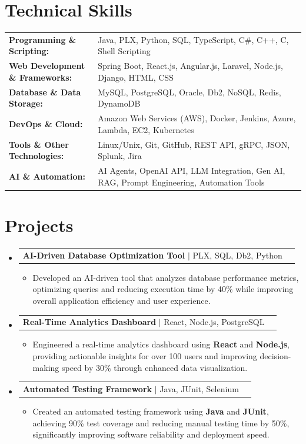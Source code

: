 \documentclass[letterpaper,10pt]{article}
\makeatletter
\newcommand{\resumeItem}[1]{
  \item{\fontsize{8pt}{9pt}\selectfont
    #1 \vspace{-3pt}
  }
}
\newcommand{\resumeProjectHeading}[2]{
    \item
    \begin{tabular*}{1.001\textwidth}{l@{\extracolsep{\fill}}r}
      \fontsize{8.5pt}{10pt}#1 & \textbf{\fontsize{8.5pt}{10pt} #2}\\
    \end{tabular*}\vspace{-7pt}
}
\newcommand{\resumeSubHeadingListStart}{\begin{itemize}[leftmargin=0pt, label={}]}
\newcommand{\resumeSubHeadingListEnd}{\end{itemize}}
\newcommand{\resumeItemListStart}{\begin{itemize}[leftmargin=*]}
\newcommand{\resumeItemListEnd}{\end{itemize}\vspace{-5pt}}
\makeatother
\begin{document}
\section{Technical Skills}
        \vspace{-14pt}
        \begin{table}[h]
            \fontsize{8pt}{9pt}\selectfont
            \begin{tabular}{p{0.3\linewidth} p{0.7\linewidth}}
                \textbf{Programming \& Scripting:} & Java, PLX, Python, SQL, TypeScript, C\#, C++, C, Shell Scripting \\
                \textbf{Web Development \& Frameworks:} & Spring Boot, React.js, Angular.js, Laravel, Node.js, Django, HTML, CSS \\
                \textbf{Database \& Data Storage:} & MySQL, PostgreSQL, Oracle, Db2, NoSQL, Redis, DynamoDB \\
                \textbf{DevOps \& Cloud:} & Amazon Web Services (AWS), Docker, Jenkins, Azure, Lambda, EC2, Kubernetes \\
                \textbf{Tools \& Other Technologies:} & Linux/Unix, Git, GitHub, REST API, gRPC, JSON, Splunk, Jira \\
                \textbf{AI \& Automation:} & AI Agents, OpenAI API, LLM Integration, Gen AI, RAG, Prompt Engineering, Automation Tools \\
            \end{tabular}
        \end{table}
 \vspace{-18pt}

\section{Projects}
    \vspace{-5pt}
    \resumeSubHeadingListStart
          \resumeProjectHeading
            {\textbf{AI-Driven Database Optimization Tool} $|$ PLX, SQL, Db2, Python}{}
            \resumeItemListStart
                \resumeItem{Developed an AI-driven tool that analyzes database performance metrics, optimizing queries and reducing execution time by 40\% while improving overall application efficiency and user experience.}
            \resumeItemListEnd
        \vspace{-12pt}
    
        \resumeProjectHeading
            {\textbf{Real-Time Analytics Dashboard} $|$ React, Node.js, PostgreSQL}{}
        \resumeItemListStart
                \resumeItem{Engineered a real-time analytics dashboard using \textbf{React} and \textbf{Node.js}, providing actionable insights for over 100 users and improving decision-making speed by 30\% through enhanced data visualization.}
        \resumeItemListEnd
      \vspace{-12pt}
      \resumeProjectHeading
        {\textbf{Automated Testing Framework} $|$ Java, JUnit, Selenium}{}
    \resumeItemListStart
            \resumeItem{Created an automated testing framework using \textbf{Java} and \textbf{JUnit}, achieving 90\% test coverage and reducing manual testing time by 50\%, significantly improving software reliability and deployment speed.}
    \resumeItemListEnd
    \resumeSubHeadingListEnd
\end{document}

